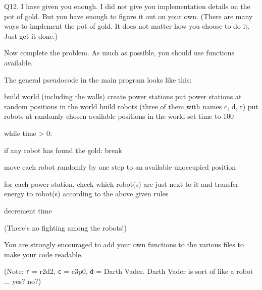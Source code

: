 Q12.
I have given you enough. 
I did not give you implementation details on the pot of gold.
But you have enough to figure it out on your own.
(There are many ways to implement the pot of gold. It
does not matter how you choose to do it. Just get it done.)

Now complete the problem.
As much as possible, you should use functions available.

The general pseudocode in the main program looks like this:
\begin{console}
build world (including the walls)
create power stations
put power stations at random positions in the world
build robots (three of them with names c, d, r)
put robots at randomly chosen available positions in the world
set time to 100

while time > 0:

    if any robot has found the gold:
        break

    move each robot randomly by one step to an available unoccupied
    position

    for each power station, check which robot(s) are just next to it
    and transfer energy to robot(s) according to the above given rules

    decrement time
\end{console}

(There's no fighting among the robots!)

You are strongly encouraged to add your own functions to the
various files to make your code readable.

(Note: \verb!r! = r2d2, \verb!c! = c3p0, \verb!d! = Darth Vader. 
Darth Vader is sort of like a robot ... yes? no?)

